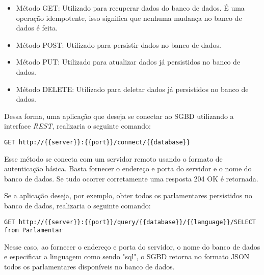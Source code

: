 \begin{itemize}
	\item Método GET: Utilizado para recuperar dados do banco de dados. É uma operação idempotente, isso significa que nenhuma mudança no banco de dados é feita.
	\item Método POST: Utilizado para persistir dados no banco de dados.
	\item Método PUT: Utilizado para atualizar dados já persistidos no banco de dados.
	\item Método DELETE: Utilizado para deletar dados já persistidos no banco de dados.
\end{itemize}

	Dessa forma, uma aplicação que deseja se conectar ao SGBD utilizando a interface \textit{REST}, realizaria o seguinte comando: 
	
\begin{lstlisting}
GET http://{{server}}:{{port}}/connect/{{database}}
\end{lstlisting}

	Esse método se conecta com um servidor remoto usando o formato de autenticação básica. Basta fornecer o endereço e porta do servidor e o nome do banco de dados. Se tudo ocorrer corretamente uma resposta 204 OK é retornada.
	
	Se a aplicação deseja, por exemplo, obter todos os parlamentares persistidos no banco de dados, realizaria o seguinte comando:
	
\begin{lstlisting}
GET http://{{server}}:{{port}}/query/{{database}}/{{language}}/SELECT 
from Parlamentar
\end{lstlisting}

	Nesse caso, ao fornecer o endereço e porta do servidor, o nome do banco de dados e especificar a linguagem como sendo "sql", o SGBD retorna no formato JSON todos os parlamentares disponíveis no banco de dados.
